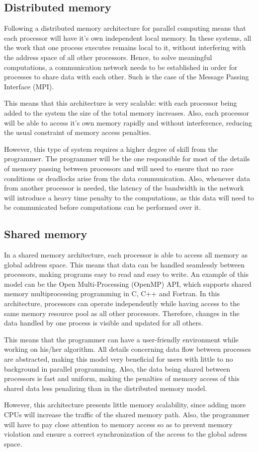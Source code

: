 \documentclass[12pt]{book}
\begin{document}
\subsection{Distributed memory}
Following a distributed memory architecture for parallel computing means that each processor will have it's own independent local memory. In these systems, all the work that one process executes remains local to it, without interfering with the address space of all other processors. Hence, to solve meaningful computations, a communication network needs to be established in order for processes to share data with each other. Such is the case of the Message Passing Interface (MPI).\par
This means that this architecture is very scalable: with each processor being added to the system the size of the total memory increases. Also, each processor will be able to access it's own memory rapidly and without interference, reducing the usual constraint of memory access penalties.
\par However, this type of system requires a higher degree of skill from the programmer. The programmer will be the one responsible for most of the details of memory passing between processors and will need to ensure that no race conditions or deadlocks arise from the data communication. Also, whenever data from another processor is needed, the latency of the bandwidth in the network will introduce a heavy time penalty to the computations, as this data will need to be communicated before computations can be performed over it.
\subsection{Shared memory}
In a shared memory architecture, each processor is able to access all memory as global address space. This means that data can be handled seamlessly between processors, making programs easy to read and easy to write. An example of this model can be the Open Multi-Processing (OpenMP) API, which supports shared memory multiprocessing programming in C, C++ and Fortran. In this architecture, processors can operate independently while having access to the same memory resource pool as all other processors. Therefore, changes in the data handled by one process is visible and updated for all others. \par
This means that the programmer can have a user-friendly environment while working on his/her algorithm. All details concerning data flow between processes are abstracted, making this model very beneficial for users with little to no background in parallel programming. Also, the data being shared between processors is fast and uniform, making the penalties of memory access of this shared data less penalizing than in the distributed memory model.
\par However, this architecture presents little memory scalability, since adding more CPUs will increase the traffic of the shared memory path. Also, the programmer will have to pay close attention to memory access so as to prevent memory violation and ensure a correct synchronization of the access to the global adress space.
\end{document}
